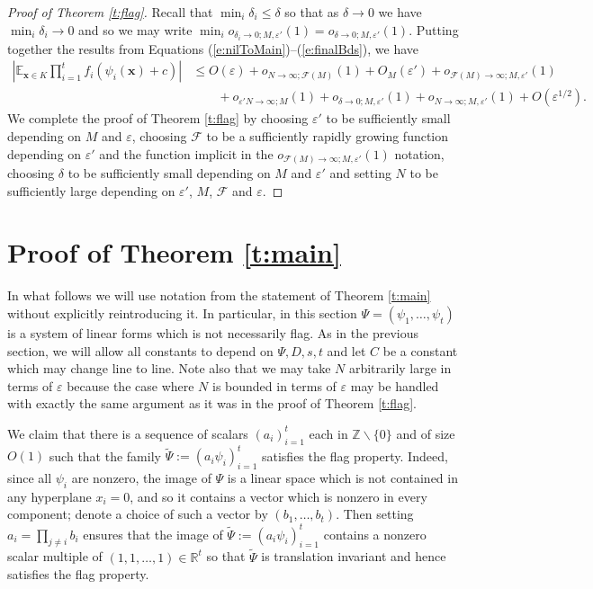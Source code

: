 \documentclass[10pt]{article}
\def\cF{\mathcal{F}}
\def\eps{\varepsilon}
\def\Z{\mathbb{Z}}
\def\R{\mathbb{R}}
\def\E{\mathbb{E}}
\newcommand{\vect}[1]{\boldsymbol{#1}}
\begin{document}
\begin{proof}[Proof of Theorem \ref{t:flag}]
Recall that $\min_i \delta_i \leq \delta$  so that as $\delta \to 0$ we have $\min_i \delta_i \to 0$ and so we may write  $\min_i o_{\delta_i\to 0;M,\eps'}(1) = o_{\delta \to 0;M,\eps'}(1)$. Putting together the results from Equations (\ref{e:nilToMain})--(\ref{e:finalBds}), we have
\begin{align*}
\left|\E_{\vect x \in K}\prod_{i=1}^t  f_i(\psi_i(\vect x) + c)\right|&\leq  O(\eps)  + o_{N\to \infty; \cF(M)}(1) + O_{M}(\eps') + o_{\cF(M)\to \infty;M,\eps'}(1)\\ &\qquad   + o_{\eps'N\to \infty;M}(1) + o_{\delta \to 0;M,\eps'}(1) + o_{N\to \infty;M,\eps'}(1) + O(\eps^{1/2}).
\end{align*}
We complete the proof of Theorem \ref{t:flag} by choosing $\eps'$ to be sufficiently small depending on $M$ and $\eps$, choosing $\cF$ to be a sufficiently rapidly growing function depending on $\eps'$ and the function implicit in the $o_{\cF(M)\to \infty;M,\eps'}(1)$ notation,  choosing $\delta$ to be sufficiently small depending on $M$ and $\eps'$  and setting $N$ to be sufficiently large depending on $\eps'$, $M$, $\cF$ and $\eps$. 
\end{proof}



\section{Proof of Theorem \ref{t:main}}
In what follows we will use notation from the statement of Theorem \ref{t:main} without explicitly reintroducing it. In particular, in this section $\Psi= (\psi_1,\ldots, \psi_t)$ is a system of linear forms which is not necessarily flag.  As in the previous section, we will allow all constants to depend on $\Psi, D, s, t$ and let $C$ be a constant which may change line to line. Note also that we may take $N$ arbitrarily large in terms of $\eps$ because the case where $N$ is bounded in terms of $\eps$ may be handled with exactly the same argument as it was in the proof of Theorem \ref{t:flag}.

We claim that there is a sequence of scalars $(a_i)_{i=1}^t$ each in $\Z\backslash \{0\}$ and of size $O(1)$ such that the family $\tilde \Psi := (a_i  \psi_i)_{i=1}^t$ satisfies the flag property. Indeed, since all $\psi_i$ are nonzero, the image of $\Psi$ is a linear space which is not contained in any hyperplane $x_i=0$, and so it contains a vector which is nonzero in every component; denote a choice of such a vector by $(b_1, \ldots, b_t)$. Then setting $a_i = \prod_{j \ne i} b_i$ ensures that the image of $\tilde \Psi := ( a_i  \psi_i)_{i=1}^t$ contains a nonzero scalar multiple of $(1,1,\ldots, 1) \in \R^t$ so that $\tilde \Psi$ is translation invariant and hence satisfies the flag property. 
\end{document}
